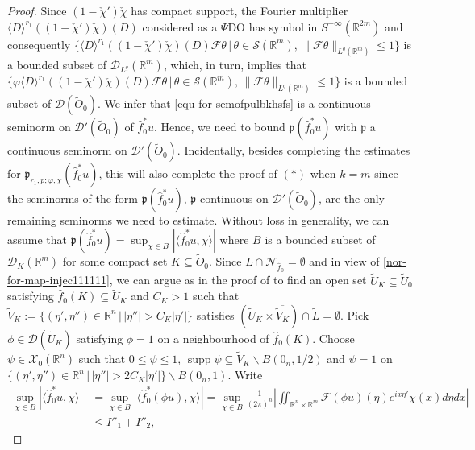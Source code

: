 \documentclass[12pt,reqno]{amsart}
\newcommand{\RR}{\mathbb R}
\newcommand{\DD}{\mathcal D}
\newcommand{\SSS}{\mathcal S}
\newcommand{\XX}{\mathcal X}
\newcommand{\supp}{\operatorname{supp}}
\theoremstyle{plain}
\theoremstyle{remark}
\theoremstyle{definition}
\numberwithin{equation}{section}
\begin{document}
\begin{proof}
Since $(1-\check{\chi}')\check{\chi}$ has compact support, the Fourier multiplier $\langle D\rangle^{r_1}((1-\check{\chi}')\check{\chi})(D)$ considered as a $\Psi$DO has symbol in $S^{-\infty}(\RR^{2m})$ and consequently $\{\langle D\rangle^{r_1}((1-\check{\chi}')\check{\chi})(D)\mathcal{F}\theta\,|\, \theta\in\SSS(\RR^m),\, \|\mathcal{F}\theta\|_{L^q(\RR^m)}\leq 1\}$ is a bounded subset of $\DD_{L^q}(\RR^m)$, which, in turn, implies that $\{\varphi\langle D\rangle^{r_1}((1-\check{\chi}')\check{\chi})(D)\mathcal{F}\theta\,|\, \theta\in\SSS(\RR^m),\, \|\mathcal{F}\theta\|_{L^q(\RR^m)}\leq 1\}$ is a bounded subset of $\DD(\widetilde{O}_0)$. We infer that \eqref{equ-for-semofpulbkhsfs} is a continuous seminorm on $\DD'(\widetilde{O}_0)$ of $\hat{f}^*_0u$. Hence, we need to bound $\mathfrak{p}(\hat{f}^*_0u)$ with $\mathfrak{p}$ a continuous seminorm on $\DD'(\widetilde{O}_0)$. Incidentally, besides completing the estimates for $\mathfrak{p}_{r_1,p;\varphi,\chi}(\hat{f}^*_0u)$, this will also complete the proof of $(*)$ when $k=m$ since the seminorms of the form $\mathfrak{p}(\hat{f}^*_0u)$, $\mathfrak{p}$ continuous on $\DD'(\widetilde{O}_0)$, are the only remaining seminorms we need to estimate. Without loss in generality, we can assume that $\mathfrak{p}(\hat{f}^*_0u)=\sup_{\chi\in B}|\langle \hat{f}^*_0u,\chi\rangle|$ where $B$ is a bounded subset of $\DD_K(\RR^m)$ for some compact set $K\subseteq \widetilde{O}_0$. Since $L\cap \mathcal{N}_{\hat{f}_0}=\emptyset$ and in view of \eqref{nor-for-map-injec111111}, we can argue as in the proof of \cite[Theorem 3.21, CASE 3]{PP} to find an open set $\widetilde{U}_K\subseteq \widetilde{U}_0$ satisfying $\hat{f}_0(K)\subseteq \widetilde{U}_K$ and $C_K>1$ such that $\widetilde{V}_K:=\{(\eta',\eta'')\in\RR^n\,|\, |\eta''|>C_K|\eta'|\}$ satisfies $(\widetilde{U}_K\times \overline{\widetilde{V}_K})\cap \widetilde{L}=\emptyset$. Pick $\phi\in\DD(\widetilde{U}_K)$ satisfying $\phi=1$ on a neighbourhood of $\hat{f}_0(K)$. Choose $\psi\in \XX_0(\RR^n)$ such that $0\leq \psi\leq1$, $\supp\psi\subseteq \widetilde{V}_K\backslash B(0_n,1/2)$ and $\psi=1$ on $\{(\eta',\eta'')\in\RR^n\,|\, |\eta''|>2C_K|\eta'|\}\backslash B(0_n,1)$. Write
\begin{align*}
\sup_{\chi\in B}|\langle \hat{f}^*_0u,\chi\rangle|&=\sup_{\chi\in B}|\langle \hat{f}^*_0(\phi u),\chi\rangle|=\sup_{\chi\in B} \frac{1}{(2\pi)^n}\left|\iint_{\RR^n\times\RR^m}\mathcal{F}(\phi u)(\eta)e^{ix\eta'}\chi(x)d\eta dx\right|\\
&\leq I''_1+I''_2,
\end{align*}

\end{proof}
\end{document}
